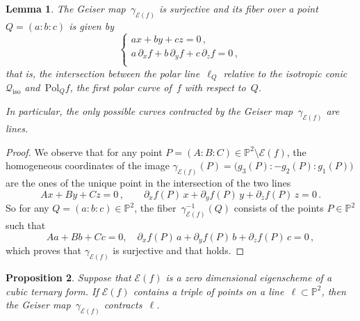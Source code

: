 \documentclass[a4paper, 11pt, reqno]{amsart}
\theoremstyle{plain}
\newtheorem{lemma}{Lemma}[section]
\newtheorem{prop}[lemma]{Proposition}
\theoremstyle{definition}
\newcommand{\p}{\mathbb{P}}
\newcommand{\iso}{\mathcal{Q}_{\mathrm{iso}}}
\newcommand{\Eig}[1]{\mathcal{E}\!\left( {#1} \right)}
\begin{document}
\begin{lemma}
The Geiser map~$\gamma_{\Eig{f}}$ is surjective and its fiber over a point $Q = (a:b:c)$ is given by
%
\begin{equation}
\label{eq:fibers}
  \left\{
  \begin{array}{l}
    a x + by + cz = 0 \,, \\[2pt]
    a \, \partial_x f + b \, \partial_y f + c \, \partial_z f = 0 \,,\\
  \end{array}
  \right.
\end{equation}
%
that is, the intersection between the polar line~$\ell_Q$ relative to the isotropic conic~$\iso$ and~$\mathrm{Pol}_Q f$, the
first polar curve of~$f$ with respect to~$Q$.

In particular, the only possible curves contracted by the Geiser map~$\gamma_{\Eig{f}}$ are lines.
\end{lemma}

\begin{proof}
We observe that for any point $P=(A:B:C) \in \p^2 \setminus \Eig{f}$, the homogeneous coordinates
of the image $\gamma_{\Eig{f}}(P) = \bigl( g_3(P): -g_2(P): g_1(P) \bigr)$ are the ones of the unique point in the intersection of the two lines
%
\[
  Ax + By+ Cz = 0 \,, \qquad
  \partial_x f(P) \, x + \partial_y f(P) \, y + \partial_z f(P) \, z = 0 \,.
\]
%
So for any $Q = (a:b:c) \in \p^2$, the fiber~$\gamma_{\Eig{f}}^{-1}(Q)$ consists of the points $P \in \p^2$ such that
%
\begin{equation}
\label{eq:polars}
  Aa + Bb+ Cc = 0, \quad
  \partial_x f(P) \, a + \partial_y f(P) \, b + \partial_z f(P) \, c = 0 \,,
\end{equation}
%
which proves that $\gamma_{\Eig{f}}$ is surjective and that  holds.
\end{proof}

\begin{prop}
\label{proposition:contract_aligned}
Suppose that $\Eig{f}$ is a zero dimensional eigenscheme of a cubic ternary form.
If $\Eig{f}$ contains a triple of points on a line~$\ell \subset \p^2$, then the Geiser map~$\gamma_{\Eig{f}}$ contracts~$\ell$.
\end{prop}
\end{document}
